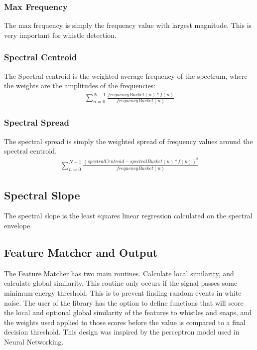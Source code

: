\documentclass[DIV=calc, paper=a4, fontsize=11pt, twocolumn]{scrartcl}   %
\begin{document}
   \subsubsection{Max Frequency}
   The max frequency is simply the frequency value with largest magnitude. This is very important for whistle detection.
   \subsubsection{Spectral Centroid}
   The Spectral centroid is the weighted average frequency of the spectrum, where the weights are the amplitudes of the frequencies:
   \begin{align}
      \sum_{n=0}^{N-1} \frac{frequencyBucket(n)*f(n)}{frequencyBucket(n)}
   \end{align}
    \subsubsection{Spectral Spread}
    The spectral spread is simply the weighted spread of frequency values around the spectral centroid.
     \begin{align}
    \sum_{n=0}^{N-1} \frac{(spectralCentroid-spectralBucket(n)*f(n))^2}{frequencyBucket(n)}
    \end{align}
\subsection{Spectral Slope}
   The spectral slope is the least squares linear regression calculated on the spectral envelope.



\subsection{Feature Matcher and Output}
The Feature Matcher has two main routines. Calculate local similarity, and calculate global similarity. This routine only occurs if the signal passes some minimum energy threshold. This is to prevent finding random events in white noise. The user of the library has the option to define functions that will score the local and optional global similarity of the features to whistles and snaps, and the weights used applied to those scores before the value is compared to a final decision threshold. This design was inspired by the perceptron model used in Neural Networking.
\end{document}
